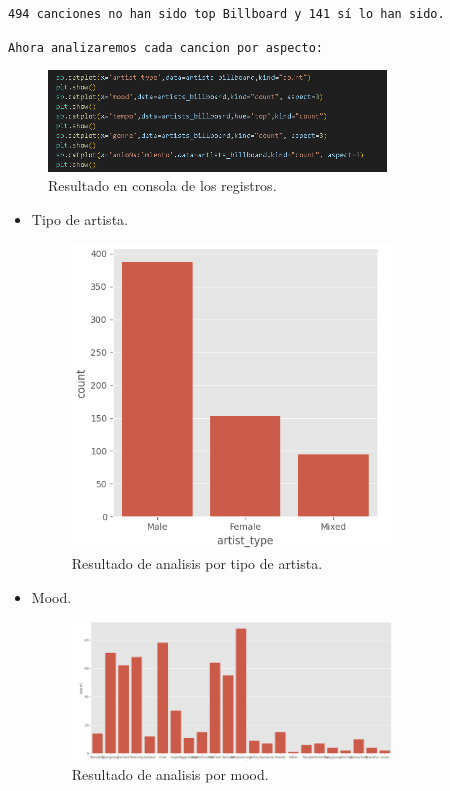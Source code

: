 \documentclass[a4paper,12pt]{article}
\begin{document}
\texttt{494 canciones no han sido top Billboard y 141 sí lo han sido.}

\texttt{Ahora analizaremos cada cancion por aspecto: }
\begin{figure}[H]
    \centering
    \includegraphics[width=0.8\textwidth]{6.png}
    \caption{Resultado en consola de los registros.}
\end{figure}
\begin{itemize}
    \item Tipo de artista.
    \begin{figure}[H]
        \centering
        \includegraphics[width=0.8\textwidth]{7.png}
        \caption{Resultado de analisis por tipo de artista.}

    \end{figure}
    \item Mood.
    \begin{figure}[H]
        \centering
        \includegraphics[width=0.8\textwidth]{8.png}
        \caption{Resultado de analisis por mood.}


\end{figure}
\end{itemize}
\end{document}
